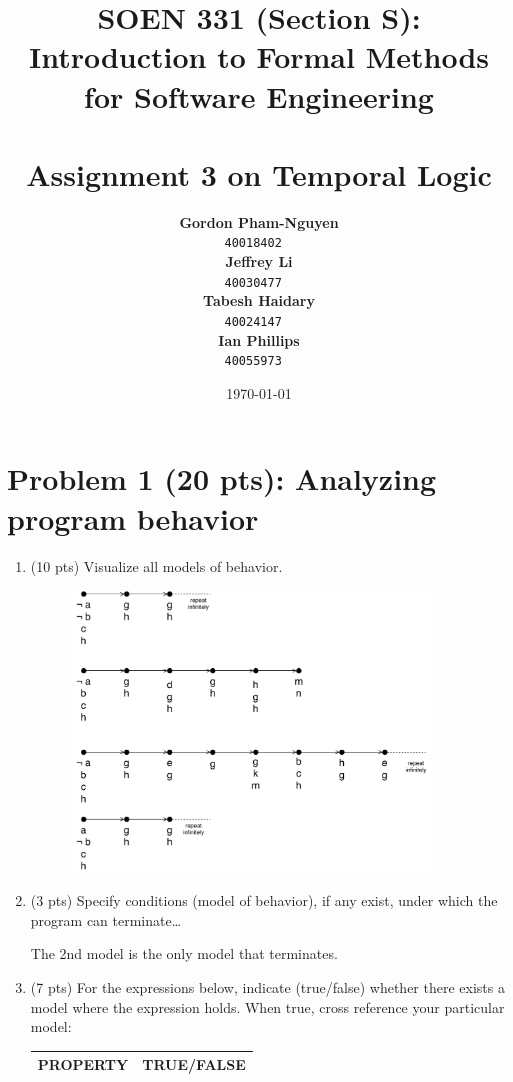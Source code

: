 \documentclass[12pt]{article}
\title{SOEN 331 (Section S): Introduction to Formal Methods\\for Software Engineering\\
\ \\
Assignment 3 on Temporal Logic}
\author{\textbf{Gordon Pham-Nguyen}\\
		\texttt{40018402}
\ \\
\textbf{Jeffrey Li}\\
		\texttt{40030477}
\ \\
\textbf{Tabesh Haidary}\\
		\texttt{40024147}
\ \\
\textbf{Ian Phillips}\\
		\texttt{40055973}
\ \\
}
\date{\today}
\begin{document}
\maketitle

\newpage

\section*{Problem 1 (20 pts):  Analyzing program behavior}

\begin{enumerate}

\item (10 pts) Visualize all models of behavior.

\begin{figure}[h!]
  \centering
  \includegraphics[width=0.9\textwidth]{figures/1_1.pdf}
 \end{figure}

\item (3 pts) Specify conditions (model of behavior), if any exist, under which the program can terminate\dots

The 2nd model is the only model that terminates.

\item (7 pts) For the expressions below, indicate (true/false) whether there exists a
model where the expression holds. When true, cross reference your particular model:

\begin{table}
\centering
\begin{tabular}{|l|l|}
\hline
\textbf{PROPERTY}							& \textbf{TRUE/FALSE}\\
\hline


\end{tabular}
\end{table}
\end{enumerate}
\end{document}
